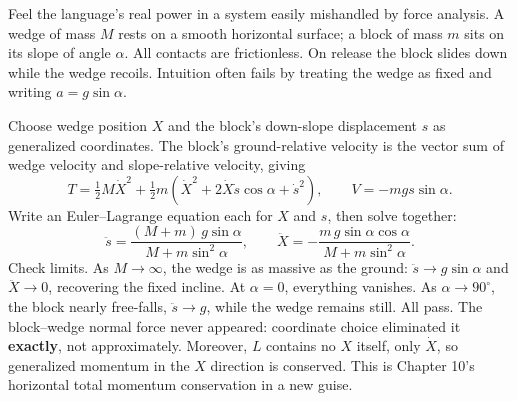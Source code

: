 \begin{challenge}
Feel the language's real power in a system easily mishandled by force analysis. A wedge of mass \(M\) rests on a smooth horizontal surface; a block of mass \(m\) sits on its slope of angle \(\alpha\). All contacts are frictionless. On release the block slides down while the wedge recoils. Intuition often fails by treating the wedge as fixed and writing \(a=g\sin\alpha\).

Choose wedge position \(X\) and the block's down-slope displacement \(s\) as generalized coordinates. The block's ground-relative velocity is the vector sum of wedge velocity and slope-relative velocity, giving
\[
T=\tfrac12 M\dot X^2+\tfrac12 m\left(\dot X^2+2\dot X\dot s\cos\alpha+\dot s^2\right),
\qquad
V=-mgs\sin\alpha .
\]
Write an Euler--Lagrange equation each for \(X\) and \(s\), then solve together:
\[
\ddot s=\frac{(M+m)\,g\sin\alpha}{M+m\sin^2\alpha},
\qquad
\ddot X=-\frac{m\,g\sin\alpha\cos\alpha}{M+m\sin^2\alpha}.
\]
Check limits. As \(M\to\infty\), the wedge is as massive as the ground: \(\ddot s\to g\sin\alpha\) and \(\ddot X\to 0\), recovering the fixed incline. At \(\alpha=0\), everything vanishes. As \(\alpha\to 90^\circ\), the block nearly free-falls, \(\ddot s\to g\), while the wedge remains still. All pass. The block--wedge normal force never appeared: coordinate choice eliminated it \textbf{exactly}, not approximately. Moreover, \(L\) contains no \(X\) itself, only \(\dot X\), so generalized momentum in the \(X\) direction is conserved. This is Chapter 10's horizontal total momentum conservation in a new guise.
\end{challenge}


